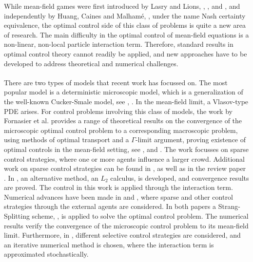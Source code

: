 
While mean-field games were first introduced by Lasry and Lions, \cite{LASRY2006619}, \cite{LASRY2006679},\cite{LASRY4} and \cite{Lasry2007}, and independently by Huang, Caines and Malham\'e,  \cite{Huang1}, under the name Nash certainty equivalence, the optimal control side of this class of problems is quite a new area of research. The main difficulty in the optimal control of mean-field equations is a non-linear, non-local particle interaction term. Therefore, standard results in optimal control theory cannot readily be applied, and new approaches have to be developed to address theoretical and numerical challenges.
\\
\\
There are two types of models that recent work has focussed on. The most popular model is a deterministic microscopic model, which is a generalization of the well-known Cucker-Smale model, see \cite{CuckerSmale1}, \cite{CuckerSmale2}. In the mean-field limit, a Vlasov-type PDE arises. For control problems involving this class of models, the work by Fornasier et al. provides a range of theoretical results on the convergence of the microscopic optimal control problem to a corresponding macroscopic problem, using methods of optimal transport and a $\Gamma$-limit argument, proving existence of optimal controls in the mean-field setting, see \cite{Fornasier_2014},
\cite{Fornasier_2014no2}
and \cite{fornasier_lisini_orrieri_savare_2019}. The work focusses on sparse control strategies, where one or more agents influence a larger crowd.
Additional work on sparse control strategies can be found in \cite{piccoli2014no1}, as well as in the review paper \cite{Fornasier_20161no1}.
In \cite{burger2019meanfield}, an alternative method, an $L_2$ calculus, is developed, and convergence results are proved. The control in this work is applied through the interaction term. 
\\
Numerical advances have been made in \cite{burger2019instantaneous} and \cite{burger2016controlling}, where sparse and other control strategies through the external agents are considered. In both papers a Strang-Splitting scheme, \cite{ChengC.Z1976Tiot}, is applied to solve the optimal control problem. The numerical results verify the convergence of the microscopic control problem to its mean-field limit.
Furthermore, in \cite{albi2016selective}, different selective control strategies are considered, and an iterative numerical method is chosen, where the interaction term is approximated stochastically.
\\
\\
